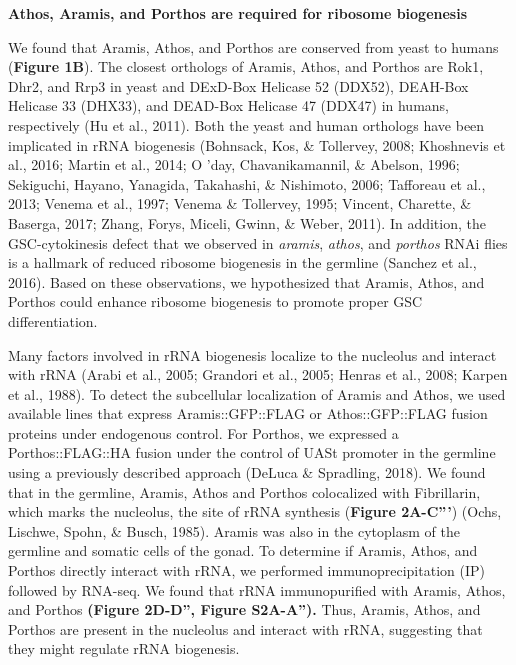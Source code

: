 \documentclass[12pt,twoside]{reedthesis}
\begin{document}
\textbf{Athos, Aramis, and Porthos are required for ribosome biogenesis}

We found that Aramis, Athos, and Porthos are conserved from yeast to
humans (\textbf{Figure 1B}). The closest orthologs of Aramis, Athos, and
Porthos are Rok1, Dhr2, and Rrp3 in yeast and DExD-Box Helicase 52
(DDX52), DEAH-Box Helicase 33 (DHX33), and DEAD-Box Helicase 47 (DDX47)
in humans, respectively (Hu et al., 2011). Both
the yeast and human orthologs have been implicated in rRNA biogenesis
(Bohnsack, Kos, \& Tollervey, 2008; Khoshnevis et al., 2016; Martin et al., 2014; O 'day, Chavanikamannil, \& Abelson, 1996; Sekiguchi, Hayano, Yanagida, Takahashi, \& Nishimoto, 2006; Tafforeau et al., 2013; Venema et al., 1997; Venema \& Tollervey, 1995; Vincent, Charette, \& Baserga, 2017; Zhang, Forys, Miceli, Gwinn, \& Weber, 2011). In addition, the
GSC-cytokinesis defect that we observed in \emph{aramis}, \emph{athos}, and
\emph{porthos} RNAi flies is a hallmark of reduced ribosome biogenesis in the
germline (Sanchez et al., 2016). Based on these observations, we
hypothesized that Aramis, Athos, and Porthos could enhance ribosome
biogenesis to promote proper GSC differentiation.

Many factors involved in rRNA biogenesis localize to the nucleolus and
interact with rRNA (Arabi et al., 2005; Grandori et al., 2005; Henras et al., 2008; Karpen et al., 1988). To detect
the subcellular localization of Aramis and Athos, we used available
lines that express Aramis::GFP::FLAG or Athos::GFP::FLAG fusion proteins
under endogenous control. For Porthos, we expressed a Porthos::FLAG::HA
fusion under the control of UASt promoter in the germline using a
previously described approach (DeLuca \& Spradling, 2018).
We found that in the germline, Aramis, Athos and Porthos colocalized
with Fibrillarin, which marks the nucleolus, the site of rRNA synthesis
(\textbf{Figure 2A-C'''}) (Ochs, Lischwe, Spohn, \& Busch, 1985). Aramis was
also in the cytoplasm of the germline and somatic cells of the gonad. To
determine if Aramis, Athos, and Porthos directly interact with rRNA, we
performed immunoprecipitation (IP) followed by RNA-seq. We found that
rRNA immunopurified with Aramis, Athos, and Porthos \textbf{(Figure 2D-D'',
Figure S2A-A'').} Thus, Aramis, Athos, and Porthos are present in the
nucleolus and interact with rRNA, suggesting that they might regulate
rRNA biogenesis.
\end{document}
